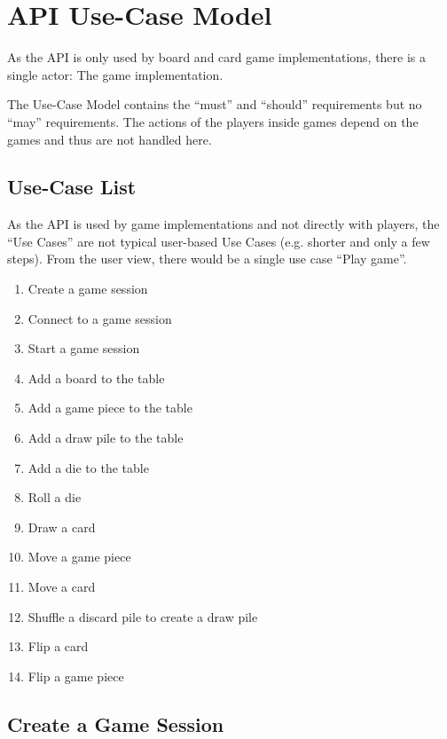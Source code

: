 \section{API Use-Case Model}

As the API is only used by board and card game implementations, there is a
single actor: The game implementation.

The Use-Case Model contains the “must” and “should” requirements but no “may”
requirements. The actions of the players inside games depend on the games and
thus are not handled here.

\subsection{Use-Case List}

As the API is used by game implementations and not directly with players, the
``Use Cases'' are not typical user-based Use Cases (e.g. shorter and only a
few steps). From the user view, there would be a single use case ``Play game''.

\begin{enumerate}
  \item Create a game session
  \item Connect to a game session
  \item Start a game session
  \item Add a board to the table
  \item Add a game piece to the table
  \item Add a \gls{draw pile} to the table
  \item Add a \gls{die} to the table
  \item Roll a \gls{die}
  \item Draw a card
  \item Move a game piece
  \item Move a card
  \item Shuffle a \gls{discard pile} to create a \gls{draw pile}
  \item Flip a card
  \item Flip a game piece
\end{enumerate}

\subsection{Create a Game Session}

